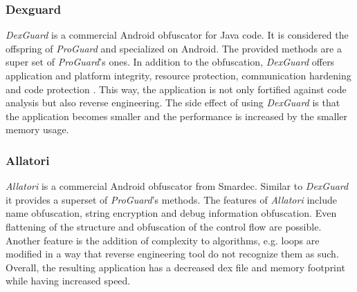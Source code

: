 
\subsubsection{Dexguard} \label{subsection:counter-obfuscation-solution-dexguard}
\textit{DexGuard} is a commercial Android obfuscator for Java code.
It is considered the offspring of \textit{ProGuard} and specialized on Android.
The provided methods are a super set of \textit{ProGuard}'s ones. \cite{strazzareLevel0}
\newline
In addition to the obfuscation, \textit{DexGuard} offers application and platform integrity, resource protection, communication hardening and code protection \cite{dexguard}.
This way, the application is not only fortified against code analysis but also reverse engineering.
\newline
The side effect of using \textit{DexGuard} is that the application becomes smaller and the performance is increased by the smaller memory usage.

\subsubsection{Allatori} \label{subsection:counter-obfuscation-solution-allatori}
\textit{Allatori} is a commercial Android obfuscator from Smardec.
Similar to \textit{DexGuard} it provides a superset of \textit{ProGuard}'s methods. \cite{allatori}
\newline
The features of \textit{Allatori} include name obfuscation, string encryption and debug information obfuscation.
Even flattening of the structure and obfuscation of the control flow are possible.
Another feature is the addition of complexity to algorithms, e.g. loops are modified in a way that reverse engineering tool do not recognize them as such.
\cite{strazzareLevel0} \cite{allatoriDoc}
\newline
Overall, the resulting application has a decreased \gls{dex} file and memory footprint while having increased speed.
